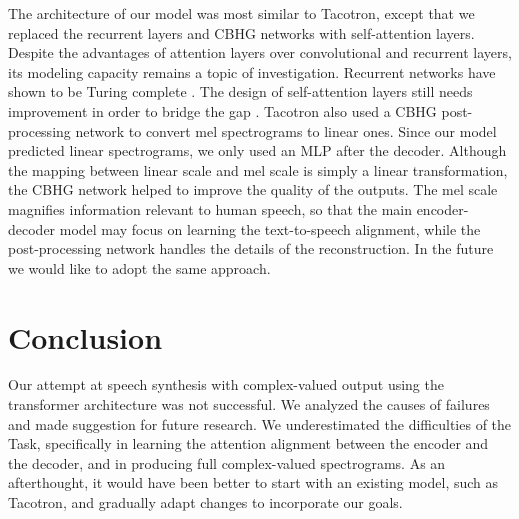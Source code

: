 \documentclass[11pt]{article}
\begin{document}
The architecture of our model was most similar to Tacotron,
except that we replaced the recurrent layers and CBHG networks with self-attention layers.
Despite the advantages of attention layers over convolutional and recurrent layers,
its modeling capacity remains a topic of investigation.
Recurrent networks have shown to be Turing complete \parencite{siegelmann1995computational}.
The design of self-attention layers still needs improvement in order to bridge the gap
\parencite{dehghani2018universal}.
Tacotron also used a CBHG post-processing network to convert mel spectrograms
to linear ones.
Since our model predicted linear spectrograms,
we only used an MLP after the decoder.
Although the mapping between linear scale and mel scale is simply a linear transformation,
the CBHG network helped to improve the quality of the outputs.
The mel scale magnifies information relevant to human speech,
so that the main encoder-decoder model may focus on learning the text-to-speech alignment,
while the post-processing network handles the details of the reconstruction.
In the future we would like to adopt the same approach.

\section{Conclusion}\label{sec:conclusion}

Our attempt at speech synthesis with complex-valued output
using the transformer architecture was not successful.
We analyzed the causes of failures and made suggestion for future research.
We underestimated the difficulties of the Task,
specifically in learning the attention alignment between the encoder and the decoder,
and in producing full complex-valued spectrograms.
As an afterthought, it would have been better to start with an existing model,
such as Tacotron, and gradually adapt changes to incorporate our goals.

\printbibliography[]
\end{document}
